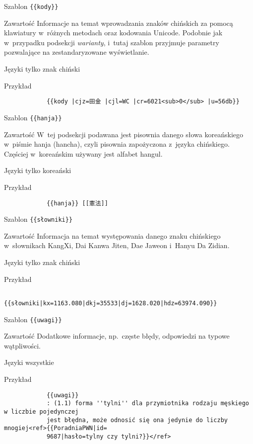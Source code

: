 \spacer
\begin{opis}
	\item[Szablon] \verb|{{kody}}|
	\item[Zawartość] Informacje na temat wprowadzania znaków chińskich za pomocą klawiatury w~różnych metodach oraz kodowania Unicode. Podobnie jak w~przypadku podsekcji \emph{warianty}, i~tutaj szablon przyjmuje parametry pozwalające na zestandaryzowane wyświetlanie.
	\item[Języki] tylko znak chiński
	\item[Przykład]
		\begin{verbatim}
			{{kody |cjz=田金 |cjl=WC |cr=6021<sub>0</sub> |u=56db}}
		\end{verbatim}
\end{opis}
\spacer
\begin{opis}
	\item[Szablon] \verb|{{hanja}}|
	\item[Zawartość] W~tej podsekcji podawana jest pisownia danego słowa koreańskiego w~piśmie hanja (hancha), czyli pisownia zapożyczona z~języka chińskiego. Częściej w~koreańskim używany jest alfabet hangul.
	\item[Języki] tylko koreański
	\item[Przykład]
		\begin{verbatim}
			{{hanja}} [[憲法]]
		\end{verbatim}
\end{opis}
\spacer
\begin{opis}
	\item[Szablon] \verb|{{słowniki}}|
	\item[Zawartość] Informacja na temat występowania danego znaku chińskiego w~słownikach KangXi, Dai Kanwa Jiten, Dae Jaweon i~Hanyu Da Zidian.
	\item[Języki] tylko znak chiński
	\item[Przykład]
		\begin{verbatim}
			{{słowniki|kx=1163.080|dkj=35533|dj=1628.020|hdz=63974.090}}
		\end{verbatim}
\end{opis}
\spacer
\begin{opis}
	\item[Szablon] \verb|{{uwagi}}|
	\item[Zawartość] Dodatkowe informacje, np.\ częste błędy, odpowiedzi na typowe wątpliwości.
	\item[Języki] wszystkie
	\item[Przykład]
		\begin{verbatim}
			{{uwagi}}
			: (1.1) forma ''tylni'' dla przymiotnika rodzaju męskiego w liczbie pojedynczej
			jest błędna, może odnosić się ona jedynie do liczby mnogiej<ref>{{PoradniaPWN|id=
			9687|hasło=tylny czy tylni?}}</ref>
		\end{verbatim}
\end{opis}
